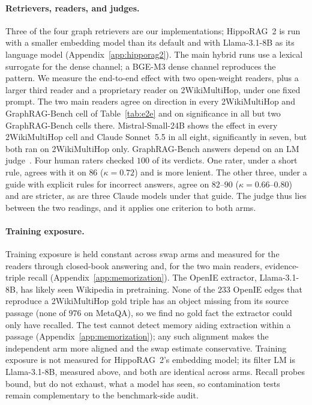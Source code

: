 \documentclass[11pt]{article}
\begin{document}
\paragraph{Retrievers, readers, and judges.} Three of the four graph retrievers are our implementations; HippoRAG~2 is run with a smaller embedding model than its default and with Llama-3.1-8B as its language model (Appendix~\ref{app:hipporag2}). The main hybrid runs use a lexical surrogate for the dense channel; a BGE-M3 dense channel reproduces the pattern. We measure the end-to-end effect with two open-weight readers, plus a larger third reader and a proprietary reader on 2WikiMultiHop, under one fixed prompt. The two main readers agree on direction in every 2WikiMultiHop and GraphRAG-Bench cell of Table~\ref{tab:e2e} and on significance in all but two GraphRAG-Bench cells there. Mistral-Small-24B shows the effect in every 2WikiMultiHop cell and Claude Sonnet~5.5 in all eight, significantly in seven, but both ran on 2WikiMultiHop only. GraphRAG-Bench answers depend on an LM judge~\citep{zheng2023judging}. Four human raters checked $100$ of its verdicts. One rater, under a short rule, agrees with it on $86$ ($\kappa=0.72$) and is more lenient. The other three, under a guide with explicit rules for incorrect answers, agree on $82$--$90$ ($\kappa=0.66$--$0.80$) and are stricter, as are three Claude models under that guide. The judge thus lies between the two readings, and it applies one criterion to both arms.

\paragraph{Training exposure.} Training exposure is held constant across swap arms and measured for the readers through closed-book answering and, for the two main readers, evidence-triple recall (Appendix~\ref{app:memorization}). The OpenIE extractor, Llama-3.1-8B, has likely seen Wikipedia in pretraining. None of the $233$ OpenIE edges that reproduce a 2WikiMultiHop gold triple has an object missing from its source passage (none of $976$ on MetaQA), so we find no gold fact the extractor could only have recalled. The test cannot detect memory aiding extraction within a passage (Appendix~\ref{app:memorization}); any such alignment makes the independent arm more aligned and the swap estimate conservative. Training exposure is not measured for HippoRAG~2's embedding model; its filter LM is Llama-3.1-8B, measured above, and both are identical across arms. Recall probes bound, but do not exhaust, what a model has seen, so contamination tests remain complementary to the benchmark-side audit.
\end{document}

